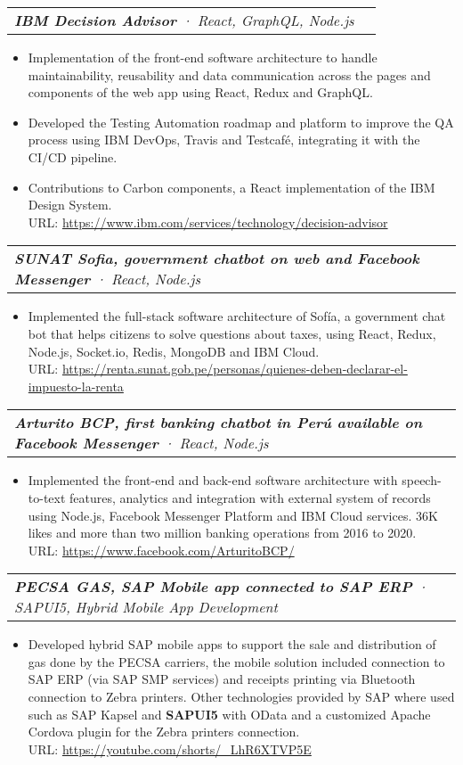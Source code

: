 \documentclass[letterpaper,11pt]{article}
\makeatletter
\newcommand{\resumeItem}[1]{
  \item\small{
    {#1 \vspace{-2pt}}
  }
}
\newcommand{\resumeSubSubheading}[2]{
    \vspace{-2pt}\item
    \begin{tabular*}{0.97\textwidth}{l@{\extracolsep{\fill}}r}
      \textit{\small#1} & \textit{\small #2} \\
    \end{tabular*}\vspace{-7pt}
}
\newcommand{\resumeItemListStart}{\begin{itemize}}
\newcommand{\resumeItemListEnd}{\end{itemize}\vspace{-5pt}}
\makeatother
\begin{document}
      \resumeSubSubheading{\textbf{IBM Decision Advisor}  · React, GraphQL, Node.js}{}
        \resumeItemListStart
          \resumeItem{Implementation of the front-end software architecture to handle maintainability, reusability and data communication across the pages and components of the web app using React, Redux and GraphQL.}
          \resumeItem{Developed the Testing Automation roadmap and platform to improve the QA process using IBM DevOps, Travis and Testcafé, integrating it with the CI/CD pipeline.}
          \resumeItem{Contributions to Carbon components, a React implementation of the IBM Design System.
          \\[1.5pt] URL: {\href{https://www.ibm.com/services/technology/decision-advisor}{\color{blue}https://www.ibm.com/services/technology/decision-advisor}}
          }
        \resumeItemListEnd

      \resumeSubSubheading{\textbf{SUNAT Sofia, government chatbot on web and Facebook Messenger} · React, Node.js}{}
        \resumeItemListStart
          \resumeItem{Implemented the full-stack software architecture of Sofía, a government chat bot that helps citizens to solve questions about taxes, using React, Redux, Node.js, Socket.io, Redis, MongoDB and IBM Cloud.
          \\[1.5pt] URL: {\href{https://renta.sunat.gob.pe/personas/quienes-deben-declarar-el-impuesto-la-renta}{\color{blue}https://renta.sunat.gob.pe/personas/quienes-deben-declarar-el-impuesto-la-renta}}
          }
        \resumeItemListEnd

      \resumeSubSubheading{\textbf{Arturito BCP, first banking chatbot in Perú available on Facebook Messenger} · React, Node.js}{}
        \resumeItemListStart
          \resumeItem{Implemented the front-end and back-end software architecture with speech-to-text features, analytics and integration with external system of records using Node.js, Facebook Messenger Platform and IBM Cloud services. 36K likes and more than two million banking operations from 2016 to 2020.
          \\[1.5pt] URL: {\href{https://www.facebook.com/ArturitoBCP/}{\color{blue}https://www.facebook.com/ArturitoBCP/}}
          }
        \resumeItemListEnd

      \resumeSubSubheading{\textbf{PECSA GAS, SAP Mobile app connected to SAP ERP} · SAPUI5, Hybrid Mobile App Development}{}
        \resumeItemListStart
          \resumeItem{Developed hybrid SAP mobile apps to support the sale and distribution of gas done by the PECSA carriers, the mobile solution included connection to SAP ERP (via SAP SMP services) and receipts printing via Bluetooth connection to Zebra printers. Other technologies provided by SAP where used such as SAP Kapsel and \textbf{SAPUI5} with OData and a customized Apache Cordova plugin for the Zebra printers connection.
          \\[1.5pt] URL: {\href{https://youtube.com/shorts/\_LhR6XTVP5E}{\color{blue}https://youtube.com/shorts/\_LhR6XTVP5E}}}
        \resumeItemListEnd
\end{document}
